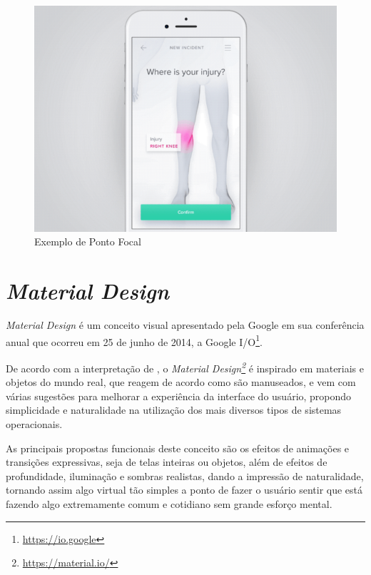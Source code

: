 \begin{enumerate}
\begin{itemize}
        \begin{figure}[htb]
        	\begin{center}
        	    \includegraphics[scale=0.35]{figs/ponto-foca.png}
        	\end{center}
        	\caption{\label{ponto focal}Exemplo de Ponto Focal}
        \end{figure}
    \end{itemize}
\end{enumerate}


\section{\textit{Material Design}}
\label{Material_Design}

\textit{Material Design} é um conceito visual apresentado pela Google em sua conferência anual que ocorreu em 25 de junho de 2014, a Google I/O\footnote{\url{https://io.google}}.

De acordo com a interpretação de , o \textit{Material Design\footnote{\url{https://material.io/}}} é inspirado em materiais e objetos do mundo real, que reagem de acordo como são manuseados, e vem com várias sugestões para melhorar a experiência da interface do usuário, propondo simplicidade e naturalidade na utilização dos mais diversos tipos de sistemas operacionais.

As principais propostas funcionais deste conceito são os efeitos de animações e transições expressivas, seja de telas inteiras ou objetos, além de efeitos de profundidade, iluminação e sombras realistas, dando a impressão de naturalidade, tornando assim algo virtual tão simples a ponto de fazer o usuário sentir que está fazendo algo extremamente comum e cotidiano sem grande esforço mental.

